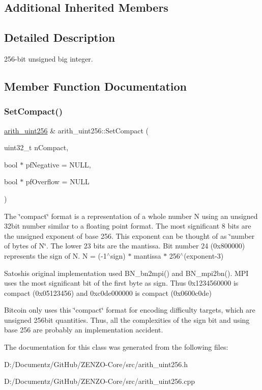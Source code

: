 \subsection*{Additional Inherited Members}


\subsection{Detailed Description}
256-\/bit unsigned big integer. 

\subsection{Member Function Documentation}
\mbox{\label{classarith__uint256_a458133c9f123519646b07e6143f2164f}} 
\subsubsection{\texorpdfstring{SetCompact()}{SetCompact()}}
{\footnotesize\ttfamily \mbox{\hyperlink{classarith__uint256}{arith\+\_\+uint256}} \& arith\+\_\+uint256\+::\+Set\+Compact (\begin{DoxyParamCaption}\item[{uint32\+\_\+t}]{n\+Compact,  }\item[{bool $\ast$}]{pf\+Negative = {\ttfamily NULL},  }\item[{bool $\ast$}]{pf\+Overflow = {\ttfamily NULL} }\end{DoxyParamCaption})}

The \char`\"{}compact\char`\"{} format is a representation of a whole number N using an unsigned 32bit number similar to a floating point format. The most significant 8 bits are the unsigned exponent of base 256. This exponent can be thought of as \char`\"{}number of bytes of N\char`\"{}. The lower 23 bits are the mantissa. Bit number 24 (0x800000) represents the sign of N. N = (-\/1$^\wedge$sign) $\ast$ mantissa $\ast$ 256$^\wedge$(exponent-\/3)

Satoshi\textquotesingle{}s original implementation used B\+N\+\_\+bn2mpi() and B\+N\+\_\+mpi2bn(). M\+PI uses the most significant bit of the first byte as sign. Thus 0x1234560000 is compact (0x05123456) and 0xc0de000000 is compact (0x0600c0de)

Bitcoin only uses this \char`\"{}compact\char`\"{} format for encoding difficulty targets, which are unsigned 256bit quantities. Thus, all the complexities of the sign bit and using base 256 are probably an implementation accident. 

The documentation for this class was generated from the following files\+:\begin{DoxyCompactItemize}
\item 
D\+:/\+Documentz/\+Git\+Hub/\+Z\+E\+N\+Z\+O-\/\+Core/src/arith\+\_\+uint256.\+h\item 
D\+:/\+Documentz/\+Git\+Hub/\+Z\+E\+N\+Z\+O-\/\+Core/src/arith\+\_\+uint256.\+cpp\end{DoxyCompactItemize}
